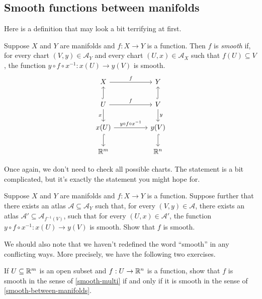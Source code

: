
\subsection{Smooth functions between manifolds}

Here is a definition that may look a bit terrifying at first. 

\begin{definition}[Smoothness] \label{smooth-between-manifolds} 
	Suppose $X$ and $Y$ are manifolds and $f : X \to Y$ is a function. Then $f$ is \emph{smooth} if, for every chart $(V, y) \in \mathscr{A}_Y$ and every chart $(U, x) \in \mathscr{A}_X$ such that $f(U) \subseteq V$, the function $y \circ f \circ x^{-1} : x(U) \to y(V)$ is smooth. 
	\[ \begin{tikzcd} X \ar{rr}{f} && Y \\ 
	U \ar{rr}{f} \ar[hookrightarrow]{u} \ar{d}[swap]{x} &&  V \ar[hookrightarrow]{u} \ar{d}{y} \\ 
	x(U) \ar{rr}{y \circ f \circ x^{-1}} \ar[hookrightarrow]{d} && y(V) \ar[hookrightarrow]{d} \\ 
	\R^m && \R^n \end{tikzcd} \]
\end{definition}

Once again, we don't need to check all possible charts. The statement is a bit complicated, but it's exactly the statement you might hope for.  

\begin{exercise} \label{smooth-local}
	Suppose $X$ and $Y$ are manifolds and $f : X \to Y$ is a function. Suppose further that there exists an atlas $\mathscr{A} \subseteq \mathscr{A}_Y$ such that, for every $(V, y) \in \mathscr{A}$, there exists an atlas $\mathscr{A}' \subseteq \mathscr{A}_{f^{-1}(V)}$, such that for every $(U, x) \in \mathscr{A}'$, the function $y \circ f \circ x^{-1} : x(U) \to y(V)$ is smooth. Show that $f$ is smooth.
\end{exercise}

We should also note that we haven't redefined the word ``smooth'' in any conflicting ways. More precisely, we have the following two exercises. 

\begin{exercise}
	If $U \subseteq \mathbb{R}^m$ is an open subset and $f : U \to \mathbb{R}^n$ is a function, show that $f$ is smooth in the sense of \cref{smooth-multi} if and only if it is smooth in the sense of \cref{smooth-between-manifolds}.
\end{exercise}

